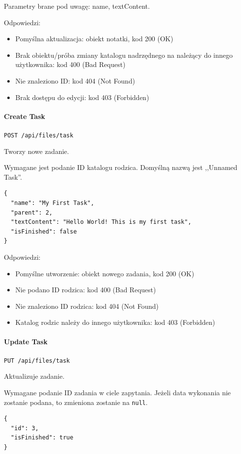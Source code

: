 \documentclass[a4paper,twoside,12pt]{book}
\begin{document}
Parametry brane pod uwagę: name, textContent.

Odpowiedzi: 
\begin{itemize}
	\item Pomyślna aktualizacja: obiekt notatki, kod 200 (OK) 
	\item Brak obiektu/próba zmiany katalogu nadrzędnego na należący do innego użytkownika: kod 400 (Bad Request) 
	\item Nie znaleziono ID: kod 404 (Not Found)
	\item Brak dostępu do edycji: kod 403 (Forbidden)
\end{itemize}

\paragraph{Create Task}

\texttt{POST /api/files/task}

Tworzy nowe zadanie.

Wymagane jest podanie ID katalogu rodzica. Domyślną nazwą jest ,,Unnamed Task''.

\begin{verbatim}
{
  "name": "My First Task",
  "parent": 2,
  "textContent": "Hello World! This is my first task",
  "isFinished": false
}
\end{verbatim}

Odpowiedzi: 
\begin{itemize}
	\item Pomyślne utworzenie: obiekt nowego zadania, kod 200 (OK) 
	\item Nie podano ID rodzica: kod 400 (Bad Request)
	\item Nie znaleziono ID rodzica: kod 404 (Not Found) 
	\item Katalog rodzic należy do innego użytkownika: kod 403 (Forbidden)
\end{itemize}

\paragraph{Update Task}

\texttt{PUT /api/files/task}

Aktualizuje zadanie.

Wymagane podanie ID zadania w ciele zapytania. Jeżeli data wykonania nie zostanie podana, to zmieniona zostanie na \texttt{null}.

\begin{verbatim}
{
  "id": 3,
  "isFinished": true
}
\end{verbatim}
\end{document}
